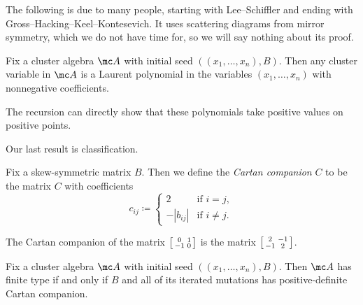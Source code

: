 \documentclass[../notes.tex]{subfiles}
\begin{document}
The following is due to many people, starting with Lee--Schiffler and ending with Gross--Hacking--Keel--Kontesevich. It uses scattering diagrams from mirror symmetry, which we do not have time for, so we will say nothing about its proof.
\begin{theorem}
	Fix a cluster algebra $\mc A$ with initial seed $((x_1,\ldots,x_n),B)$. Then any cluster variable in $\mc A$ is a Laurent polynomial in the variables $(x_1,\ldots,x_n)$ with nonnegative coefficients.
\end{theorem}
\begin{remark}
	The recursion can directly show that these polynomials take positive values on positive points.
\end{remark}
Our last result is classification.
\begin{definition}
	Fix a skew-symmetric matrix $B$. Then we define the \textit{Cartan companion} $C$ to be the matrix $C$ with coefficients
	\[c_{ij}\coloneqq\begin{cases}
		2 & \text{if }i=j, \\
		-\left|b_{ij}\right| & \text{if }i\ne j.
	\end{cases}\]
\end{definition}
\begin{example}
	The Cartan companion of the matrix $\begin{bsmallmatrix}
		0 & 1 \\ -1 & 0
	\end{bsmallmatrix}$ is the matrix $\begin{bsmallmatrix}
		2 & -1 \\ -1 & 2
	\end{bsmallmatrix}$.
\end{example}
\begin{theorem}
	Fix a cluster algebra $\mc A$ with initial seed $((x_1,\ldots,x_n),B)$. Then $\mc A$ has finite type if and only if $B$ and all of its iterated mutations has positive-definite Cartan companion.
\end{theorem}
\end{document}
